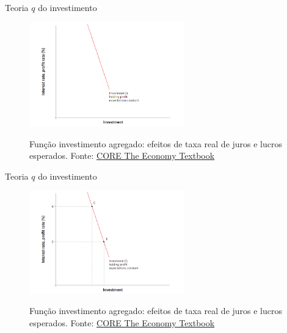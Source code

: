 \documentclass[10pt]{beamer}
\begin{document}
\begin{frame}
    {Teoria $q$ do investimento}
    \begin{figure}
        \centering
        \href{https://core-econ.org/the-economy/book/text/14.html\#144-investment-spending}{\includegraphics[width=0.6\textwidth]{./figures/aula8_fig9.PNG}}
        \caption{Função investimento agregado: efeitos de taxa real de juros e lucros esperados. Fonte: \href{https://core-econ.org/the-economy/book/text/14.html\#144-investment-spending}{CORE The Economy Textbook}}
    \end{figure}
\end{frame}

\begin{frame}
    {Teoria $q$ do investimento}
    \begin{figure}
        \centering
        \href{https://core-econ.org/the-economy/book/text/14.html\#144-investment-spending}{\includegraphics[width=0.6\textwidth]{./figures/aula8_fig10.PNG}}
        \caption{Função investimento agregado: efeitos de taxa real de juros e lucros esperados. Fonte: \href{https://core-econ.org/the-economy/book/text/14.html\#144-investment-spending}{CORE The Economy Textbook}}
    \end{figure}
\end{frame}
\end{document}
